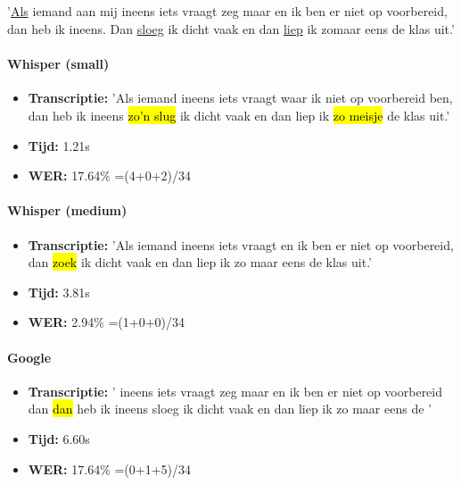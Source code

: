 \subsection{}%
'\underline{Als} iemand aan mij ineens iets vraagt zeg maar en ik ben er niet op voorbereid, dan heb ik ineens. Dan \underline{sloeg} ik dicht vaak en dan \underline{liep} ik zomaar eens de klas uit.'

\paragraph{Whisper (small)}
\begin{itemize}
    \item \textbf{Transcriptie:} 'Als iemand\hl{ }ineens iets vraagt waar ik niet op voorbereid ben, dan heb ik ineens \hl{zo'n slug} ik dicht vaak en dan liep ik \hl{zo meisje} de klas uit.'
    \item \textbf{Tijd:} 1.21s
    \item \textbf{WER:} 17.64\% =(4+0+2)/34
\end{itemize}

\paragraph{Whisper (medium)}
\begin{itemize}
    \item \textbf{Transcriptie:} 'Als iemand ineens iets vraagt en ik ben er niet op voorbereid, dan \hl{zoek} ik dicht vaak en dan liep ik zo maar eens de klas uit.'
    \item \textbf{Tijd:} 3.81s
    \item \textbf{WER:} 2.94\% =(1+0+0)/34
\end{itemize}

\paragraph{Google}
\begin{itemize}
\item \textbf{Transcriptie:} '\hl{ }ineens iets vraagt zeg maar en ik ben er niet op voorbereid dan \hl{dan} heb ik ineens\hl{ }sloeg ik dicht vaak en dan liep ik zo maar eens de \hl{ }'
\item \textbf{Tijd:} 6.60s
\item \textbf{WER:} 17.64\% =(0+1+5)/34
\end{itemize}


